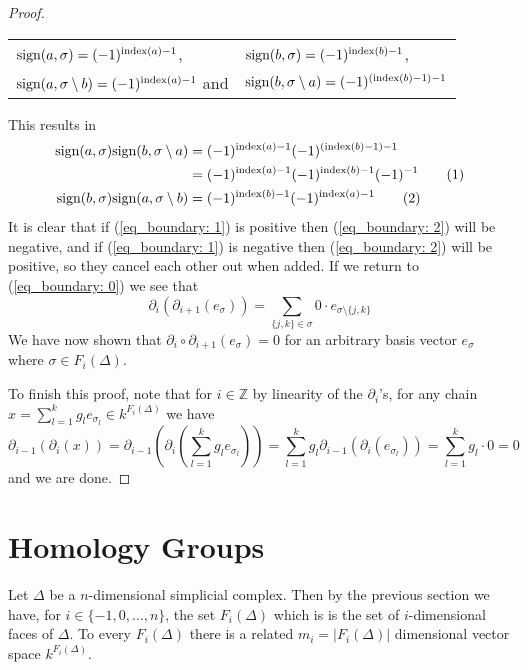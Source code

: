 \documentclass[11pt,a4paper,twoside]{report}
\newcommand\numberthis{\addtocounter{equation}{1}\tag{\theequation}}
\begin{document}
\begin{proof}
\begin{tabular}{l l}
$\textnormal{sign}(a,\sigma) = (-1)^{\textnormal{index}(a)-1}$,  &$\textnormal{sign}(b,\sigma) = (-1)^{\textnormal{index}(b)-1}$,\\
$\textnormal{sign}(a,\sigma\setminus b) = (-1)^{\textnormal{index}(a)-1}$ and &$\textnormal{sign}(b,\sigma\setminus a) = (-1)^{(\textnormal{index}(b)-1)-1}$
\end{tabular}

This results in
\begin{align*}
\textnormal{sign}(a,\sigma)\textnormal{sign}(b,\sigma\setminus a) &= (-1)^{\textnormal{index}(a)-1}(-1)^{(\textnormal{index}(b)-1)-1}\\
&= (-1)^{\textnormal{index}(a)-1}(-1)^{\textnormal{index}(b)-1}(-1)^{-1} \numberthis\label{eq_boundary: 1} \\
\textnormal{sign}(b,\sigma)\textnormal{sign}(a,\sigma\setminus b) &= (-1)^{\textnormal{index}(b)-1}(-1)^{\textnormal{index}(a)-1} \numberthis \label{eq_boundary: 2}\\
\end{align*}
It is clear that if (\ref{eq_boundary: 1}) is positive then (\ref{eq_boundary: 2}) will be negative, and if (\ref{eq_boundary: 1}) is negative then (\ref{eq_boundary: 2}) will be positive, so they cancel each other out when added. If we return to (\ref{eq_boundary: 0}) we see that 
\begin{equation*}
\partial_i(\partial_{i+1}(e_\sigma))=\sum_{\{j,k\}\in\sigma}0\cdot e_{\sigma\setminus\{j,k\}} 
\end{equation*}
We have now shown that $\partial_i\circ\partial_{i+1}(e_\sigma)=0$ for an arbitrary basis vector $e_\sigma$ where $\sigma\in F_i(\Delta)$. 

To finish this proof, note that for $i \in\mathbb{Z}$ by linearity of the $\partial_i$'s, for any chain $x = \sum_{l=1}^kg_le_{\sigma_l}\in k^{F_i(\Delta)}$ we have 
\begin{equation*}
\partial_{i-1}(\partial_i(x)) = \partial_{i-1}\left(\partial_i\left(\sum_{l=1}^kg_le_{\sigma_l}\right)\right) = \sum_{l=1}^kg_l\partial_{i-1}(\partial_i(e_{\sigma_l}))=\sum_{l=1}^kg_l\cdot 0=0
\end{equation*}
and we are done.
\end{proof}

\section{Homology Groups}
Let $\Delta$ be a $n$-dimensional simplicial complex. Then by the previous section we have, for $i\in\{-1,0,\dots,n\}$, the set $F_i(\Delta)$ which is is the set of $i$-dimensional faces of $\Delta$. To every $F_i(\Delta)$ there is a related $m_i = |F_i(\Delta)|$ dimensional vector space $k^{F_i(\Delta)}$.
\end{document}
